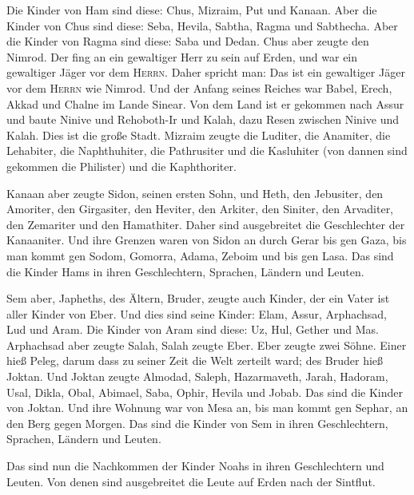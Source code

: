  Die Kinder von Ham sind diese: Chus, Mizraim, Put und
Kanaan.  Aber die Kinder von Chus sind diese: Seba,
Hevila, Sabtha, Ragma und Sabthecha. Aber die Kinder von Ragma sind
diese: Saba und Dedan.  Chus aber zeugte den Nimrod. Der
fing an ein gewaltiger Herr zu sein auf Erden,  und war
ein gewaltiger Jäger vor dem \textsc{Herrn}. Daher spricht man: Das ist
ein gewaltiger Jäger vor dem \textsc{Herrn} wie Nimrod. 
Und der Anfang seines Reiches war Babel, Erech, Akkad und Chalne im
Lande Sinear.  Von dem Land ist er gekommen nach Assur
und baute Ninive und Rehoboth-Ir und Kalah,  dazu Resen
zwischen Ninive und Kalah. Dies ist die große Stadt. 
Mizraim zeugte die Luditer, die Anamiter, die Lehabiter, die
Naphthuhiter,  die Pathrusiter und die Kasluhiter (von
dannen sind gekommen die Philister) und die Kaphthoriter.

 Kanaan aber zeugte Sidon, seinen ersten Sohn, und Heth,
 den Jebusiter, den Amoriter, den Girgasiter,
 den Heviter, den Arkiter, den Siniter, 
den Arvaditer, den Zemariter und den Hamathiter. Daher sind ausgebreitet
die Geschlechter der Kanaaniter.  Und ihre Grenzen waren
von Sidon an durch Gerar bis gen Gaza, bis man kommt gen Sodom, Gomorra,
Adama, Zeboim und bis gen Lasa.  Das sind die Kinder Hams
in ihren Geschlechtern, Sprachen, Ländern und Leuten.

 Sem aber, Japheths, des Ältern, Bruder, zeugte auch
Kinder, der ein Vater ist aller Kinder von Eber.  Und
dies sind seine Kinder: Elam, Assur, Arphachsad, Lud und Aram.
 Die Kinder von Aram sind diese: Uz, Hul, Gether und Mas.
 Arphachsad aber zeugte Salah, Salah zeugte Eber.
 Eber zeugte zwei Söhne. Einer hieß Peleg, darum dass zu
seiner Zeit die Welt zerteilt ward; des Bruder hieß Joktan.
 Und Joktan zeugte Almodad, Saleph, Hazarmaveth, Jarah,
 Hadoram, Usal, Dikla,  Obal, Abimael,
Saba,  Ophir, Hevila und Jobab. Das sind die Kinder von
Joktan.  Und ihre Wohnung war von Mesa an, bis man kommt
gen Sephar, an den Berg gegen Morgen.  Das sind die
Kinder von Sem in ihren Geschlechtern, Sprachen, Ländern und Leuten.

 Das sind nun die Nachkommen der Kinder Noahs in ihren
Geschlechtern und Leuten. Von denen sind ausgebreitet die Leute auf
Erden nach der Sintflut.

